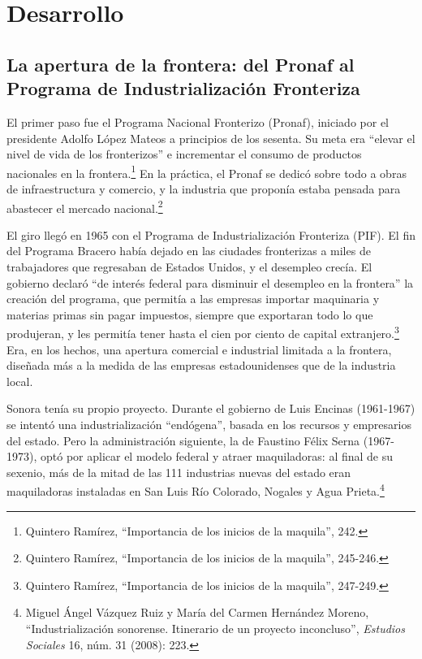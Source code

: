 \documentclass[12pt]{article}
\newcommand{\quintero}{Quintero Ramírez, \enquote{Importancia de los inicios de la maquila}}
\begin{document}
\section{Desarrollo}

\subsection{La apertura de la frontera: del Pronaf al Programa de Industrialización Fronteriza}

El primer paso fue el Programa Nacional Fronterizo (Pronaf), iniciado por el presidente Adolfo López Mateos a principios de los sesenta. Su meta era \enquote{elevar el nivel de vida de los fronterizos} e incrementar el consumo de productos nacionales en la frontera.\footnote{\quintero, 242.} En la práctica, el Pronaf se dedicó sobre todo a obras de infraestructura y comercio, y la industria que proponía estaba pensada para abastecer el mercado nacional.\footnote{\quintero, 245-246.}

El giro llegó en 1965 con el Programa de Industrialización Fronteriza (PIF). El fin del Programa Bracero había dejado en las ciudades fronterizas a miles de trabajadores que regresaban de Estados Unidos, y el desempleo crecía. El gobierno declaró \enquote{de interés federal para disminuir el desempleo en la frontera} la creación del programa, que permitía a las empresas importar maquinaria y materias primas sin pagar impuestos, siempre que exportaran todo lo que produjeran, y les permitía tener hasta el cien por ciento de capital extranjero.\footnote{\quintero, 247-249.} Era, en los hechos, una apertura comercial e industrial limitada a la frontera, diseñada más a la medida de las empresas estadounidenses que de la industria local.

Sonora tenía su propio proyecto. Durante el gobierno de Luis Encinas (1961-1967) se intentó una industrialización \enquote{endógena}, basada en los recursos y empresarios del estado. Pero la administración siguiente, la de Faustino Félix Serna (1967-1973), optó por aplicar el modelo federal y atraer maquiladoras: al final de su sexenio, más de la mitad de las 111 industrias nuevas del estado eran maquiladoras instaladas en San Luis Río Colorado, Nogales y Agua Prieta.\footnote{Miguel Ángel Vázquez Ruiz y María del Carmen Hernández Moreno, \enquote{Industrialización sonorense. Itinerario de un proyecto inconcluso}, \emph{Estudios Sociales} 16, núm. 31 (2008): 223.}
\end{document}
